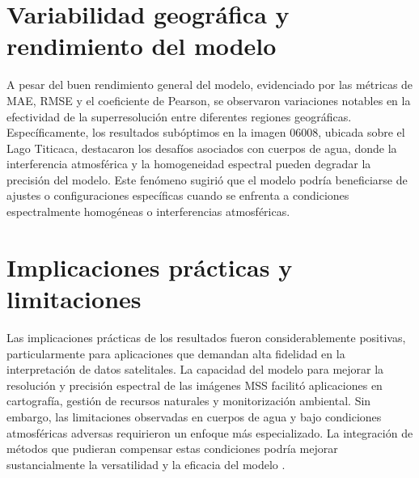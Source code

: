     \section{Variabilidad geográfica y rendimiento del modelo}
        A pesar del buen rendimiento general del modelo, evidenciado por las métricas de MAE, RMSE y el coeficiente de Pearson, se observaron variaciones notables en la efectividad de la superresolución entre diferentes regiones geográficas. Específicamente, los resultados subóptimos en la imagen 06008, ubicada sobre el Lago Titicaca, destacaron los desafíos asociados con cuerpos de agua, donde la interferencia atmosférica y la homogeneidad espectral pueden degradar la precisión del modelo. Este fenómeno sugirió que el modelo podría beneficiarse de ajustes o configuraciones específicas cuando se enfrenta a condiciones espectralmente homogéneas o interferencias atmosféricas.

    \section{Implicaciones prácticas y limitaciones}
        Las implicaciones prácticas de los resultados fueron considerablemente positivas, particularmente para aplicaciones que demandan alta fidelidad en la interpretación de datos satelitales. La capacidad del modelo para mejorar la resolución y precisión espectral de las imágenes MSS facilitó aplicaciones en cartografía, gestión de recursos naturales y monitorización ambiental. Sin embargo, las limitaciones observadas en cuerpos de agua y bajo condiciones atmosféricas adversas requirieron un enfoque más especializado. La integración de métodos que pudieran compensar estas condiciones podría mejorar sustancialmente la versatilidad y la eficacia del modelo .

